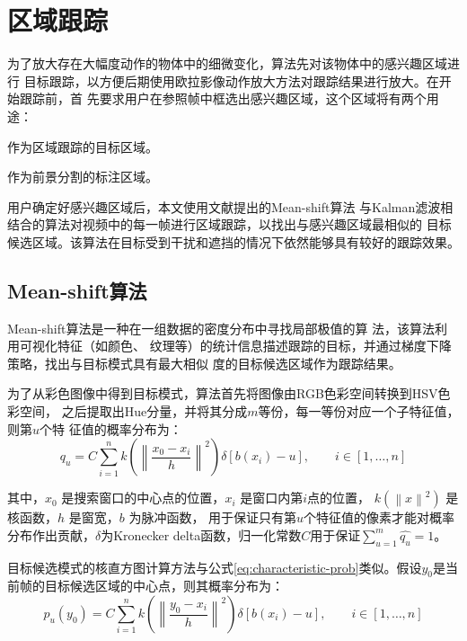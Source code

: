 \section{区域跟踪}
\label{sec:tracking}

为了放大存在大幅度动作的物体中的细微变化，算法先对该物体中的感兴趣区域进行
目标跟踪，以方便后期使用欧拉影像动作放大方法对跟踪结果进行放大。在开始跟踪前，首
先要求用户在参照帧中框选出感兴趣区域，这个区域将有两个用途：

\begin{compactenum}
\item 作为区域跟踪的目标区域。
\item 作为前景分割的标注区域。
\end{compactenum}

用户确定好感兴趣区域后，本文使用文献\cite{常发亮2007}提出的Mean-shift算法
与Kalman滤波相结合的算法对视频中的每一帧进行区域跟踪，以找出与感兴趣区域最相似的
目标候选区域。该算法在目标受到干扰和遮挡的情况下依然能够具有较好的跟踪效果。

\subsection{Mean-shift算法}
\label{sec:mean-shift}

Mean-shift算法是一种在一组数据的密度分布中寻找局部极值的算
法，该算法利用可视化特征（如颜色、
纹理等）的统计信息描述跟踪的目标，并通过梯度下降策略，找出与目标模式具有最大相似
度的目标候选区域作为跟踪结果。

为了从彩色图像中得到目标模式，算法首先将图像由RGB色彩空间转换到HSV色彩空间，
之后提取出Hue分量，并将其分成$m$等份，每一等份对应一个子特征值，则第$u$个特
征值的概率分布为：
\begin{equation}
  \label{eq:characteristic-prob}
  q_{u}=C\sum_{i=1}^{n}k\left( \left\| \frac{x_{0}-x_{i}}{h} \right\|^{2}
  \right)\delta[b(x_{i})-u],\qquad i\in[1,\ldots,n]
\end{equation}

其中，$x_{0}$ 是搜索窗口的中心点的位置，$x_{i}$ 是窗口内第$i$点的位置，
$k\left( \left\| x \right\|^{2} \right)$ 是核函数，$h$ 是窗宽，$b$ 为脉冲函数，
用于保证只有第$u$个特征值的像素才能对概率分布作出贡献，$\delta$为Kronecker
delta函数，归一化常数$C$用于保证$\sum_{u=1}^{m}\hat{q_u}=1$。

目标候选模式的核直方图计算方法与公式\ref{eq:characteristic-prob}类似。假设$y_0$是当前帧的目标候选区域的中心点，则其概率分布为：
\begin{equation}
  \label{eq:target-candidate}
  p_{u}(y_0)=C\sum_{i=1}^{n}k\left( \left\| \frac{y_{0}-x_{i}}{h} \right\|^{2}
  \right)\delta[b(x_{i})-u],\qquad i\in[1,\ldots,n]
\end{equation}

